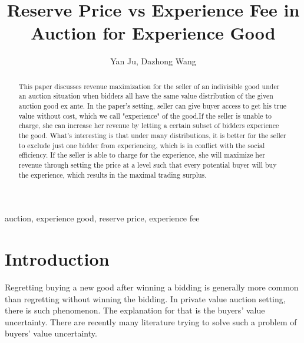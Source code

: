 \documentclass[review]{elsarticle}
\begin{document}
\begin{frontmatter}

\title{ Reserve Price vs Experience Fee in Auction for Experience Good}


\author{Yan Ju, Dazhong Wang}
\address{Wuchuan Road 111, Shanghai }
\address[mymainaddress]{School of Economics}
\address[mysecondaryaddress]{Shanghai University of Finance and Economics}


\begin{abstract}
This paper discusses revenue maximization for the seller of an indivisible
good under an auction situation when bidders all have the same
value distribution of the given auction good ex ante. In the paper's
setting, seller can give buyer access to get his true value without
cost, which we call "experience" of the good.If the seller is
unable to charge, she can increase her revenue by  letting a certain subset of  bidders experience the good. What's interesting is 
that  under many distributions, it is better for the seller to exclude just one bidder from experiencing, which is in conflict with the social efficiency. If
the seller is able to charge for the experience, she will maximize her revenue  through setting
the price at a level such that every potential buyer will buy the experience,
which results in the maximal trading surplus.
\end{abstract}

\begin{keyword}
 auction, experience good, reserve price, experience fee
\end{keyword}

\end{frontmatter}



\section{Introduction}
Regretting buying a new good after winning a bidding is
generally more common than regretting without winning the bidding. In
private value auction setting, there is such phenomenon. The
explanation for that is the buyers' value uncertainty. There are
recently many literature trying to solve such a problem of buyers'
value uncertainty.
\end{document}
